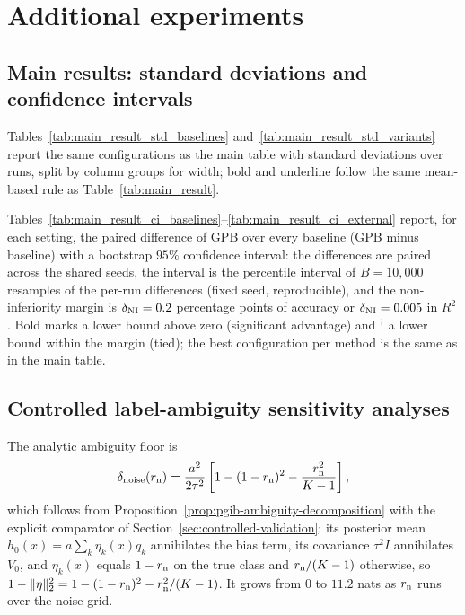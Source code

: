 \section{Additional experiments}
\label{app:experiments}

\subsection{Main results: standard deviations and confidence intervals}
\label{app:main-ci}

Tables~\ref{tab:main_result_std_baselines} and~\ref{tab:main_result_std_variants}
report the same configurations as the main table with standard deviations over
runs, split by column groups for width; bold and underline follow the same
mean-based rule as Table~\ref{tab:main_result}.



Tables~\ref{tab:main_result_ci_baselines}--\ref{tab:main_result_ci_external}
report, for each setting, the paired difference of GPB over every baseline
(GPB minus baseline) with a bootstrap $95\%$ confidence interval: the differences
are paired across the shared seeds, the interval is the percentile interval of
$B = 10{,}000$ resamples of the per-run differences (fixed seed, reproducible), and
the non-inferiority margin is $\delta_{\rm NI} = 0.2$ percentage points of accuracy or
$\delta_{\rm NI} = 0.005$ in $R^2$. Bold marks a lower bound above zero (significant
advantage) and $^{\dagger}$ a lower bound within the margin (tied); the best
configuration per method is the same as in the main table.


\subsection{Controlled label-ambiguity sensitivity analyses}
\label{app:noisy-alignment-sensitivity}

The analytic ambiguity floor is
\begin{equation}
\delta_{\rm noise}(r_{\rm n})=\frac{a^2}{2\tau^2}
\left[1-(1-r_{\rm n})^2-\frac{r_{\rm n}^2}{K-1}\right],
\label{eq:synthetic-noise-floor}
\end{equation}
which follows from Proposition~\ref{prop:pgib-ambiguity-decomposition} with the
explicit comparator of Section~\ref{sec:controlled-validation}: its posterior mean
$h_0(x)=a\sum_k\eta_k(x)q_k$ annihilates the bias term, its covariance $\tau^2I$
annihilates $V_0$, and $\eta_k(x)$ equals $1-r_{\rm n}$ on the true class and $r_{\rm n}/(K-1)$
otherwise, so $1-\|\eta\|_2^2=1-(1-r_{\rm n})^2-r_{\rm n}^2/(K-1)$. It grows from $0$ to $11.2$
nats as $r_{\rm n}$ runs over the noise grid.


